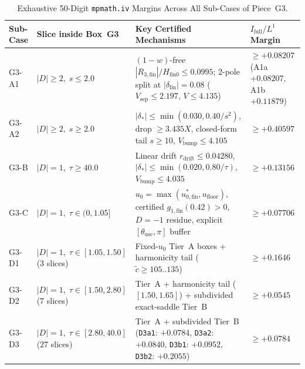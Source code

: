 \documentclass[10pt]{article}
\numberwithin{equation}{section}
\theoremstyle{plain}
\theoremstyle{definition}
\newcommand{\1}{\mathbf{1}}
\newcommand{\code}[1]{\texttt{#1}}
\begin{document}
\begin{table}[htbp]
\centering
\caption{Exhaustive 50-Digit \code{mpmath.iv} Margins Across All Sub-Cases of Piece~G3.}
\label{tab:G3}
\footnotesize
\begin{tabularx}{\textwidth}{@{} >{\raggedright\arraybackslash}p{1.65cm} >{\raggedright\arraybackslash}p{3.05cm} >{\raggedright\arraybackslash}X >{\raggedright\arraybackslash}p{2.35cm} @{}}
\toprule
\textbf{Sub-Case} & \textbf{Slice inside Box~G3} & \textbf{Key Certified Mechanisms} & \textbf{$I_{\mathrm{full}}/L^1$ Margin} \\
\midrule
G3-A1 & $|D| \ge 2,\; s \le 2.0$ & $(1-w)$-free $|R_{3,\mathrm{fin}}|/H_{\mathrm{fin}0} \le 0.0995$; 2-pole split at $|\delta_{\mathrm{fin}}| = 0.08$ ($V_{\mathrm{sep}} \le 2.197$, $V \le 4.135$) & $\ge +0.08207$ (A1a $+0.08207$, A1b $+0.11879$) \\
\addlinespace[2pt]
G3-A2 & $|D| \ge 2,\; s \ge 2.0$ & $|\delta_*| \le \min(0.030, 0.40/s^2)$, drop $\ge 3.435 X$, closed-form tail $s \ge 10$, $V_{\mathrm{bump}} \le 4.105$ & $\ge +0.40597$ \\
\addlinespace[2pt]
G3-B & $|D| = 1,\; \tau \ge 40.0$ & Linear drift $r_{\mathrm{drift}} \le 0.04280$, $|\delta_*| \le \min(0.020, 0.80/\tau)$, $V_{\mathrm{bump}} \le 4.035$ & $\ge +0.13156$ \\
\addlinespace[2pt]
G3-C & $|D| = 1,\; \tau \in (0, 1.05]$ & $u_0 = \max(u_{0,\mathrm{fin}}^*, u_{\mathrm{floor}})$, certified $g_{1,\mathrm{fin}}(0.42) > 0$, $D=-1$ residue, explicit $[\theta_{\mathrm{use}}, \pi]$ buffer & $\ge +0.07706$ \\
\addlinespace[2pt]
G3-D1 & $|D| = 1,\; \tau \in [1.05, 1.50]$ ($3$ slices) & Fixed-$u_0$ Tier~A boxes + harmonicity tail ($\tilde{c} \ge 105..135$) & $\ge +0.1646$ \\
\addlinespace[2pt]
G3-D2 & $|D| = 1,\; \tau \in [1.50, 2.80]$ ($7$ slices) & Tier~A + harmonicity tail ($[1.50, 1.65]$) + subdivided exact-saddle Tier~B & $\ge +0.0545$ \\
\addlinespace[2pt]
G3-D3 & $|D| = 1,\; \tau \in [2.80, 40.0]$ ($27$ slices) & Tier~A + subdivided Tier~B (\code{D3a1}: $+0.0784$, \code{D3a2}: $+0.0840$, \code{D3b1}: $+0.0952$, \code{D3b2}: $+0.2055$) & $\ge +0.0784$ \\
\bottomrule
\end{tabularx}
\end{table}
\end{document}
